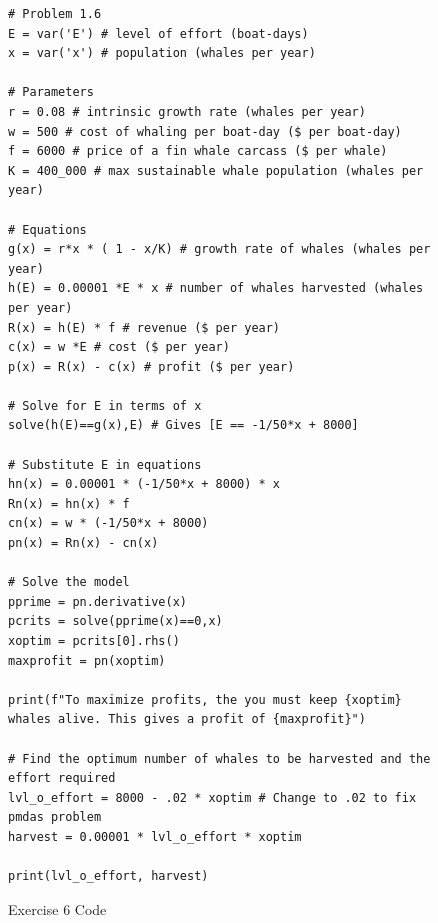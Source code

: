 \documentclass[12pt, oneside]{book}
\begin{document}
\begin{figure}
    \label{ex:6}
    \begin{verbatim}
# Problem 1.6
E = var('E') # level of effort (boat-days)
x = var('x') # population (whales per year)

# Parameters
r = 0.08 # intrinsic growth rate (whales per year)
w = 500 # cost of whaling per boat-day ($ per boat-day)
f = 6000 # price of a fin whale carcass ($ per whale)
K = 400_000 # max sustainable whale population (whales per year)

# Equations
g(x) = r*x * ( 1 - x/K) # growth rate of whales (whales per year)
h(E) = 0.00001 *E * x # number of whales harvested (whales per year)
R(x) = h(E) * f # revenue ($ per year)
c(x) = w *E # cost ($ per year)
p(x) = R(x) - c(x) # profit ($ per year)

# Solve for E in terms of x
solve(h(E)==g(x),E) # Gives [E == -1/50*x + 8000]

# Substitute E in equations
hn(x) = 0.00001 * (-1/50*x + 8000) * x
Rn(x) = hn(x) * f
cn(x) = w * (-1/50*x + 8000)
pn(x) = Rn(x) - cn(x)

# Solve the model
pprime = pn.derivative(x)
pcrits = solve(pprime(x)==0,x)
xoptim = pcrits[0].rhs()
maxprofit = pn(xoptim)

print(f"To maximize profits, the you must keep {xoptim} whales alive. This gives a profit of {maxprofit}")

# Find the optimum number of whales to be harvested and the effort required
lvl_o_effort = 8000 - .02 * xoptim # Change to .02 to fix pmdas problem
harvest = 0.00001 * lvl_o_effort * xoptim

print(lvl_o_effort, harvest)
    \end{verbatim}
    \caption{Exercise 6 Code}
\end{figure}
\end{document}
